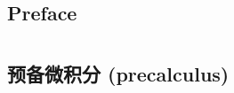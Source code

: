 \documentclass[openany]{book}
\begin{document}
\addtocounter{page}{2}

\chapter*{Preface}


\setcounter{tocdepth}{1}
\tableofcontents

\mainmatter

\part{}

\chapter{预备微积分 (precalculus)}








\backmatter
{}
\printindex
\end{document}
